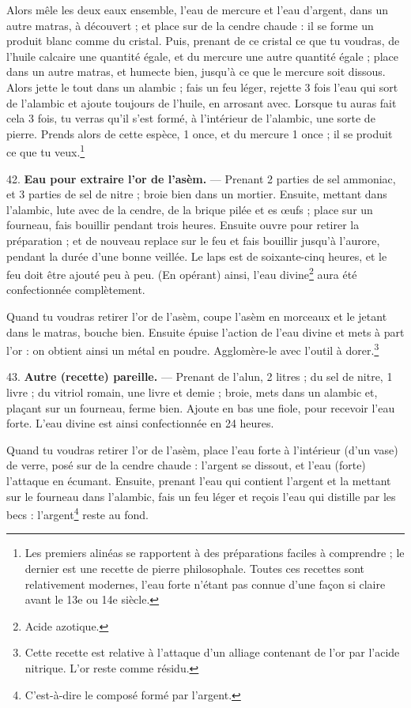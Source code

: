 \documentclass[a4paper, 11pt, oneside, polutonikogreek, french]{article}
\begin{document}
Alors mêle les deux eaux ensemble, l'eau de mercure et l'eau d'argent, dans un autre matras, à découvert ; et place sur de la cendre chaude : il se forme un produit blanc comme du cristal. Puis, prenant de ce cristal ce que tu voudras, de l'huile calcaire une quantité égale, et du mercure une autre quantité égale ; place dans un autre matras, et humecte bien, jusqu'à ce que le mercure soit dissous. Alors jette le tout dans un alambic ; fais un feu léger, rejette 3 fois l'eau qui sort de l'alambic et ajoute toujours de l'huile, en arrosant avec. Lorsque tu auras fait cela 3 fois, tu verras qu'il s'est formé, à l'intérieur de l'alambic, une sorte de pierre. Prends alors de cette espèce, 1 once, et du mercure 1 once ; il se produit ce que tu veux.\footnote{Les premiers alinéas se rapportent à des préparations faciles à comprendre ; le dernier est une recette de pierre philosophale. Toutes ces recettes sont relativement modernes, l'eau forte n'étant pas connue d'une façon si claire avant le 13e ou 14e siècle.}

42. \textbf{Eau pour extraire l'or de l'asèm.} --- Prenant 2 parties de sel ammoniac, et 3 parties de sel de nitre ; broie bien dans un mortier. Ensuite, mettant dans l'alambic, lute avec de la cendre, de la brique pilée et es œufs ; place sur un fourneau, fais bouillir pendant trois heures. Ensuite ouvre pour retirer la préparation ; et de nouveau replace sur le feu et fais bouillir jusqu'à l'aurore, pendant la durée d'une bonne veillée. Le laps est de soixante-cinq heures, et le feu doit être ajouté peu à peu. (En opérant) ainsi, l'eau divine\footnote{Acide azotique.} aura été confectionnée complètement.

Quand tu voudras retirer l'or de l'asèm, coupe l'asèm en morceaux et le jetant dans le matras, bouche bien. Ensuite épuise l'action de l'eau divine et mets à part l'or : on obtient ainsi un métal en poudre. Agglomère-le avec l'outil à dorer.\footnote{Cette recette est relative à l'attaque d'un alliage contenant de l'or par l'acide nitrique. L'or reste comme résidu.}

43. \textbf{Autre (recette) pareille.} --- Prenant de l'alun, 2 litres ; du sel de nitre, 1 livre ; du vitriol romain, une livre et demie ; broie, mets dans un alambic et, plaçant sur un fourneau, ferme bien. Ajoute en bas une fiole, pour recevoir l'eau forte. L'eau divine est ainsi confectionnée en 24 heures.

Quand tu voudras retirer l'or de l'asèm, place l'eau forte à l'intérieur (d'un vase) de verre, posé sur de la cendre chaude : l'argent se dissout, et l'eau (forte) l'attaque en écumant. Ensuite, prenant l'eau qui contient l'argent et la mettant sur le fourneau dans l'alambic, fais un feu léger et reçois l'eau qui distille par les becs : l'argent\footnote{C'est-à-dire le composé formé par l'argent.} reste au fond.
\end{document}
